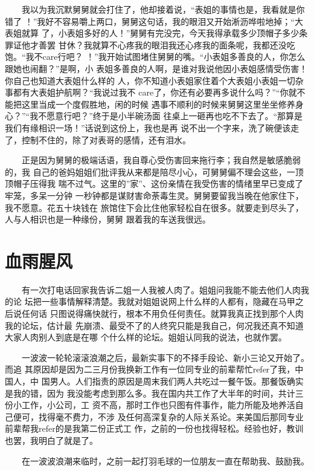 \documentclass[12pt]{book}
\begin{document}
　　我以为我沉默舅舅就会打住了，他却接着说，“表姐的事情也是，我看就是你错了
！”我好不容易嚼上两口，舅舅这句话，我的眼泪又开始淅沥哗啦地掉；“大表姐就算
了，小表姐多好的人！”舅舅有完没完，今天我得承载多少顶帽子多少条罪证他才善罢
甘休？我就算不心疼我的眼泪我还心疼我的面条呢，我都还没吃饱。“我不care行吧？
！”我开始试图堵住舅舅的嘴。“小表姐多善良的人，你怎么跟她也闹翻？”是啊，小
表姐多善良的人啊，是谁对我说他因小表姐感情受伤害！你自己也知道大表姐什么样的
人，你不知道小表姐家住着个大表姐小表姐一切杂事都有大表姐护航啊？“我说过我不
care了，你还有必要再多说什么吗？”“你就不能把这里当成一个度假胜地，闲的时候
遇事不顺利的时候来舅舅这里坐坐修养身心？”“我不愿意行吧？”终于是小半碗汤面
往桌上一砸再也吃不下去了。“那算是我们有缘相识一场！”话说到这份上，我也是再
说不出一个字来，洗了碗便该走了，控制不住的，除了对表哥的感情，还有泪水。

　　正是因为舅舅的极端话语，我自尊心受伤害回来拖行李；我自然是敏感脆弱的，我
自己的爸妈姐姐们批评我从来都是陪尽小心，可舅舅偏不理会这些，一顶顶帽子压得我
喘不过气。这里的”家”、这份亲情在我受伤害的情绪里早已变成了牢笼，多呆一分钟
一秒钟都是谋财害命荼毒生灵。舅舅要留我当晚在他家住下，我不愿意。花五十块钱在
旅馆住下会比住他家轻松自在很多。就要走到尽头了，人与人相识也是一种缘份，舅舅
跟着我的车送我很远。

\section{血雨腥风}
\label{sec-8-8}

　　有一次打电话回家我告诉二姐一人我被人肉了。姐姐问我能不能去他们人肉我的论
坛把一些事情解释清楚。我就对姐姐说网上什么样的人都有，隐藏在马甲之后说任何话
只图说得痛快就行，根本不用负任何责任。就算我真正找到那个人肉我的论坛，估计最
先崩溃、最受不了的人终究只能是我自己，何况我还真不知道大家人肉别人到底是在哪
个什么样的论坛。姐姐认同我的说法，也就作罢。

　　一波波一轮轮滚滚浪潮之后，最新实事下的不择手段论、新小三论又开始了。而追
其原因却是因为二三月份我换新工作有一位同专业的前辈帮忙refer了我，中国人，中
国男人。人们指责的原因是周末我们两人共吃过一餐午饭。那餐饭确实是我的错，因为
我没能考虑到那么多。我在国内共工作了大半年的时间，共计三份小工作，小公司，工
资不高，那时工作也只图有件事作，能力所能及地养活自己便可，找得毫不费力，不涉
及任何高深复杂的人际关系论。来美国后那同专业前辈帮我refer的是我第二份正式工
作，之前的一份也找得轻松。经验也好，教训也罢，我明白了就是了。

　　在一波波浪潮来临时，之前一起打羽毛球的一位朋友一直在帮助我、鼓励我。
\end{document}
